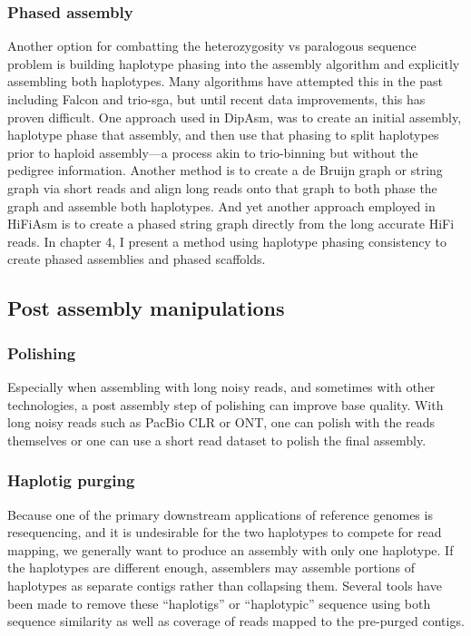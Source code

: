 \subsubsection{Phased assembly}

\par{
Another option for combatting the heterozygosity vs paralogous sequence problem is building haplotype phasing into the assembly algorithm and explicitly assembling both haplotypes. Many algorithms have attempted this in the past including Falcon\cite{falcon} and trio-sga\cite{trio-sga}, but until recent data improvements, this has proven difficult. One approach used in DipAsm, was to create an initial assembly, haplotype phase that assembly, and then use that phasing to split haplotypes prior to haploid assembly---a process akin to trio-binning but without the pedigree information\cite{dipasm}. Another method is to create a de Bruijn graph or string graph via short reads and align long reads onto that graph to both phase the graph and assemble both haplotypes\cite{Garg2018}. And yet another approach employed in HiFiAsm is to create a phased string graph directly from the long accurate HiFi reads\cite{hifiasm}. In chapter 4, I present a method using haplotype phasing consistency to create phased assemblies and phased scaffolds.
}

\subsection{Post assembly manipulations}
\subsubsection{Polishing}
\par{
Especially when assembling with long noisy reads, and sometimes with other technologies, a post assembly step of polishing can improve base quality. With long noisy reads such as PacBio CLR or ONT, one can polish with the reads themselves\cite{arrow}\cite{nanopolish} or one can use a short read dataset to polish the final assembly\cite{pilon}.
}
\subsubsection{Haplotig purging}

\par{
Because one of the primary downstream applications of reference genomes is resequencing, and it is undesirable for the two haplotypes to compete for read mapping, we generally want to produce an assembly with only one haplotype. If the haplotypes are different enough, assemblers may assemble portions of haplotypes as separate contigs rather than collapsing them. Several tools have been made to remove these ``haplotigs'' or ``haplotypic'' sequence using both sequence similarity as well as coverage of reads mapped to the pre-purged contigs\cite{haplomerger}\cite{purge}\cite{purgedups}.
}
